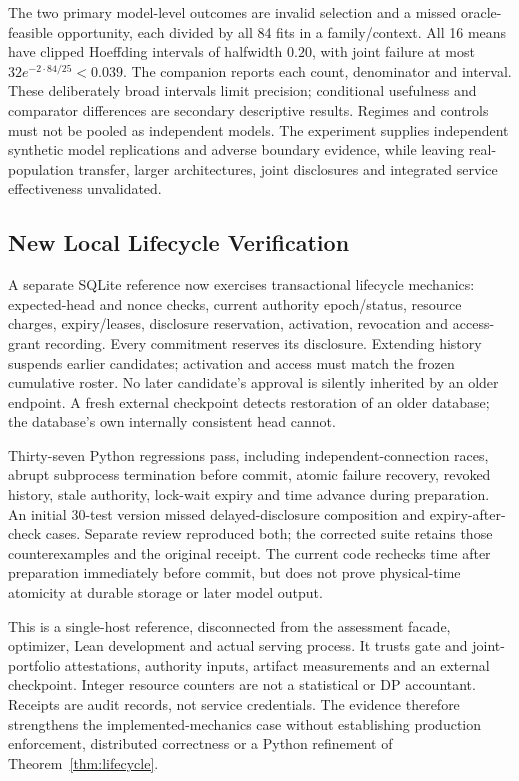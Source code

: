 The two primary model-level outcomes are invalid selection and a missed
oracle-feasible opportunity, each divided by all 84 fits in a family/context.
All 16 means have clipped Hoeffding intervals of halfwidth $0.20$, with joint
failure at most $32e^{-2\cdot84/25}<0.039$. The companion reports each count,
denominator and interval. These deliberately broad intervals limit precision;
conditional usefulness and comparator differences are secondary descriptive
results. Regimes and controls must not be pooled as independent models.
The experiment supplies independent synthetic model replications and adverse
boundary evidence, while leaving real-population transfer, larger architectures,
joint disclosures and integrated service effectiveness unvalidated.

\subsection{New Local Lifecycle Verification}
\label{sec:local-lifecycle-study}
A separate SQLite reference now exercises transactional lifecycle mechanics:
expected-head and nonce checks, current authority epoch/status, resource
charges, expiry/leases, disclosure reservation, activation, revocation and
access-grant recording. Every commitment reserves its disclosure. Extending
history suspends earlier candidates; activation and access must match the
frozen cumulative roster. No later candidate's approval is silently inherited
by an older endpoint. A fresh external checkpoint detects restoration of an
older database; the database's own internally consistent head cannot.

Thirty-seven Python regressions pass, including independent-connection races,
abrupt subprocess termination before commit, atomic failure recovery, revoked
history, stale authority, lock-wait expiry and time advance during preparation.
An initial 30-test version missed delayed-disclosure composition and expiry-after-
check cases. Separate review reproduced both; the corrected suite retains those
counterexamples and the original receipt. The current code rechecks time after
preparation immediately before commit, but does not prove physical-time atomicity
at durable storage or later model output.

This is a single-host reference, disconnected from the assessment facade,
optimizer, Lean development and actual serving process. It trusts gate and
joint-portfolio attestations, authority inputs, artifact measurements and an
external checkpoint. Integer resource counters are not a statistical or DP
accountant. Receipts are audit records, not service credentials. The evidence
therefore strengthens the implemented-mechanics case without establishing
production enforcement, distributed correctness or a Python refinement of
Theorem~\ref{thm:lifecycle}.
